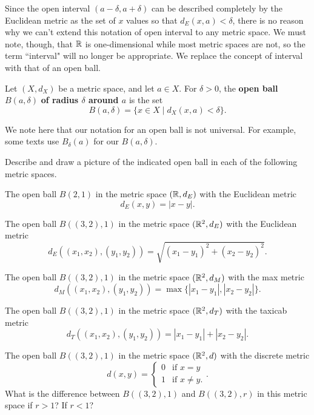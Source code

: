 Since the open interval $(a-\delta, a+\delta)$ can be described completely by the Euclidean metric as the set of $x$ values so that $d_E(x,a) < \delta$, there is no reason why we can't extend this notation of open interval to any metric space. We must note, though, that $\mathbb{R}$ is one-dimensional while most metric spaces are not, so the term ``interval" will no longer be appropriate. We replace the concept of interval with that of an open ball.

\begin{definition} Let $(X, d_X)$ be a metric space, and let $a \in X$. For $\delta > 0$, the \textbf{open ball} $B(a, \delta)$ \textbf{of radius $\delta$ around $a$} is the set 
\[B(a, \delta) = \{x \in X \mid d_X(x,a) < \delta\}.\]
\end{definition}

We note here that our notation for an open ball is not universal. For example, some texts use $B_{\delta}(a)$ for our $B(a,\delta)$. 

\begin{pa} Describe and draw a picture of the indicated open ball in each of the following metric spaces. 
\be
\item The open ball $B(2, 1)$ in the metric space $(\mathbb{R}, d_E)$ with the Euclidean metric
\[d_E(x,y) = | x-y |.\]

\item The open ball $B((3,2), 1)$ in the metric space $(\mathbb{R}^2, d_E)$ with the Euclidean metric
\[d_E((x_1,x_2),(y_1,y_2)) = \sqrt{(x_1-y_1)^2 + (x_2-y_2)^2}.\]


\item The open ball $B((3,2), 1)$ in the metric space $(\mathbb{R}^2, d_M)$ with the max metric
\[d_M((x_1,x_2),(y_1,y_2)) = \max\{| x_1-y_1 |, | x_2-y_2 |\}.\]

\item The open ball $B((3,2), 1)$ in the metric space $(\mathbb{R}^2, d_T)$ with the taxicab metric
\[d_T((x_1,x_2),(y_1,y_2)) = | x_1-y_1 | + | x_2-y_2 |.\]

\item The open ball $B((3,2), 1)$ in the metric space $(\mathbb{R}^2, d)$ with the discrete metric
\[d(x,y) = \begin{cases} 0 &\text{if } x=y \\ 1 &\text{if } x \neq y.\end{cases}.\]
What is the difference between $B((3,2),1)$ and $B((3,2),r)$ in this metric space if $r > 1$? If $r < 1$?

\ee


\end{pa}

